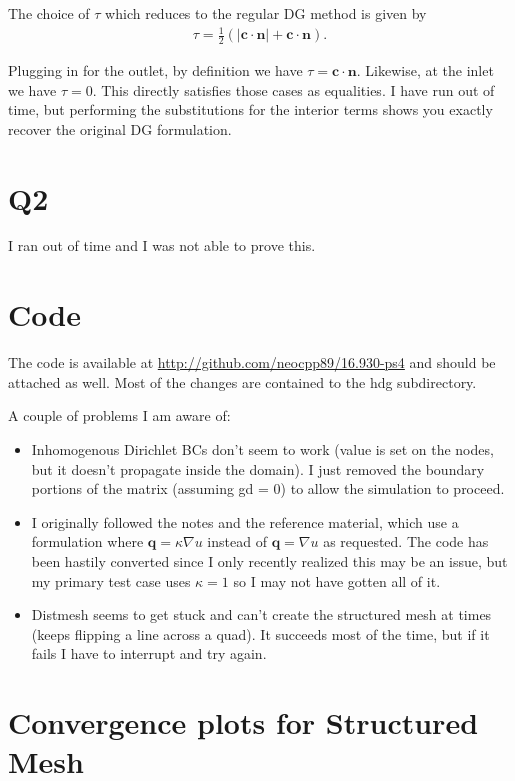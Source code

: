 \documentclass{article}
\begin{document}
The choice of $\tau$ which reduces to the regular DG method is given by
\begin{align}
\tau = \frac{1}{2} \left( | \mathbf{c} \cdot \mathbf{n} | + \mathbf{c} \cdot \mathbf{n} \right).
\end{align}

Plugging in for the outlet, by definition we have $\tau = \mathbf{c} \cdot \mathbf{n}$.
Likewise, at the inlet we have $\tau = 0$.
This directly satisfies those cases as equalities.
I have run out of time, but performing the substitutions for the interior terms shows you exactly recover the original DG formulation.

\section{Q2}
I ran out of time and I was not able to prove this.

\section{Code}
The code is available at \url{http://github.com/neocpp89/16.930-ps4} and should be attached as well.
Most of the changes are contained to the hdg subdirectory.

A couple of problems I am aware of:
\begin{itemize}
\item Inhomogenous Dirichlet BCs don't seem to work (value is set on the nodes, but it doesn't propagate inside the domain).
I just removed the boundary portions of the matrix (assuming gd = 0) to allow the simulation to proceed.
\item I originally followed the notes and the reference material\cite{nguyen}, which use a formulation where $\mathbf{q} = \kappa \nabla u$ instead of $\mathbf{q} = \nabla u$ as requested. The code has been hastily converted since I only recently realized this may be an issue, but my primary test case uses $\kappa = 1$ so I may not have gotten all of it.
\item Distmesh seems to get stuck and can't create the structured mesh at times (keeps flipping a line across a quad).
It succeeds most of the time, but if it fails I have to interrupt and try again.
\end{itemize}

\section{Convergence plots for Structured Mesh}
\end{document}
